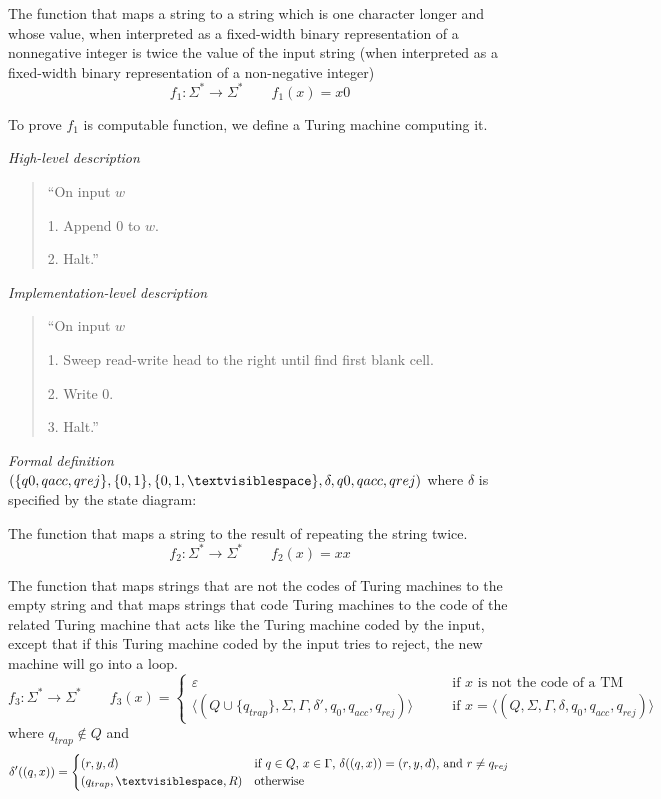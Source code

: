 \documentclass[12pt, oneside]{article}
\begin{document}
The function that maps a string to a string which is one character longer and 
whose value, when interpreted as a fixed-width binary representation of a
nonnegative integer is twice the value of the input string (when interpreted as 
a fixed-width binary representation of a non-negative integer)
\[
f_1: \Sigma^* \to \Sigma^* \qquad  f_1(x)  = x0
\]

To prove $f_1$ is computable function, we define a Turing machine computing it.

{\it High-level description}
\begin{quote}
    ``On input $w$
    
    1. Append $0$ to $w$.
    
    2. Halt.''
\end{quote}

{\it Implementation-level description}
\begin{quote}
    ``On input $w$
    
    1. Sweep read-write head to the right until find first blank cell.
    
    2. Write 0.
    
    3. Halt.''
\end{quote}

{\it Formal definition} $(\{q0, qacc, qrej\}, \{0,1\}, \{0,1,\textvisiblespace\},\delta, q0, qacc, qrej)$
where $\delta$ is specified by the state diagram: 


\newpage


The function that maps a string to the result of repeating the string twice.
\[
f_2: \Sigma^* \to \Sigma^* \qquad f_2( x )  =  xx
\]

\vfill

The function that maps strings that are not the codes of Turing machines to the empty 
string and that maps strings that code Turing machines to the code of the 
related Turing machine that acts like the Turing machine coded by the input, except
that if this Turing machine coded by the input tries to reject, the 
new machine will go into a loop.
\[
f_3: \Sigma^* \to \Sigma^*  \qquad f_3( x )  =   \begin{cases}  \varepsilon \qquad&\text{if $x$ is not the code of  a TM} \\
\langle (Q \cup \{q_{trap} \}, \Sigma, \Gamma, \delta', q_0, q_{acc}, q_{rej} ) \rangle \qquad&\text{if $x = \langle (Q, \Sigma, \Gamma, \delta, q_0, q_{acc}, q_{rej} )\rangle$}\end{cases}
\]
where $q_{trap} \notin Q$ and 
\[\delta'( (q,x) ) = \begin{cases}
(r,y,d) &\text{if $q \in Q$, $x \in \Gamma$, $\delta ((q,x)) = (r,y,d)$, and  $r \neq  q_{rej}$} \\
(q_{trap}, \textvisiblespace, R) & \text{otherwise}
\end{cases}
\]
\vfill
\end{document}
